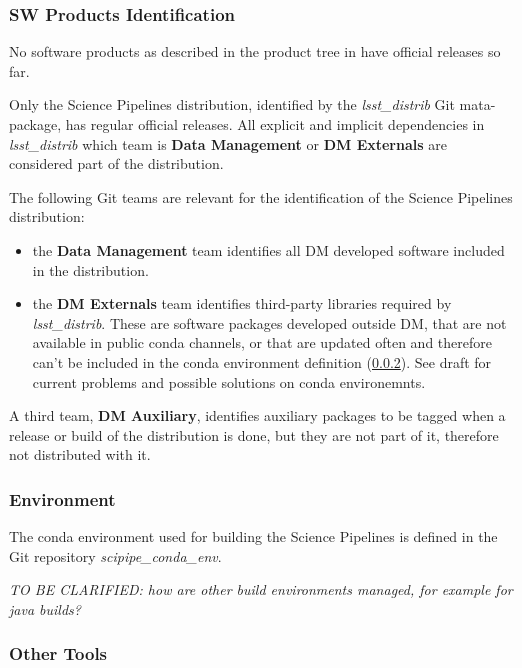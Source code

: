 \subsubsection{SW Products Identification} \label{sec:statusIdentification}

No software products as described in the product tree in  have official releases so far. 

Only the Science Pipelines distribution, identified by the \textit{lsst\_distrib} Git mata-package, has regular official releases.
All explicit and implicit dependencies in \textit{lsst\_distrib} which team is \textbf{Data Management} or \textbf{DM Externals} are considered part of the distribution.

The following Git teams are relevant for the identification of the Science Pipelines distribution:

\begin{itemize}
\item the \textbf{Data Management} team identifies all DM developed software included in the distribution.
\item the \textbf{DM Externals} team identifies third-party libraries required by \textit{lsst\_distrib}.
These are software packages developed outside DM, that are not available in public conda channels, or that are updated often and therefore can't be included in the conda environment definition (\ref{sec:statusEnvs}).
See draft  for current problems and possible solutions on conda environemnts.
\end{itemize}

A third team, \textbf{DM Auxiliary}, identifies auxiliary packages to be tagged when a release or build of the distribution is done, but they are not part of it, therefore not distributed with it.


\subsubsection{Environment} \label{sec:statusEnvs}

The conda environment used for building the Science Pipelines is defined in the Git repository \textit{scipipe\_conda\_env}.

\textit{TO BE CLARIFIED: how are other build environments managed, for example for java builds?}


\subsubsection{Other Tools} \label{sec:statusTools}

